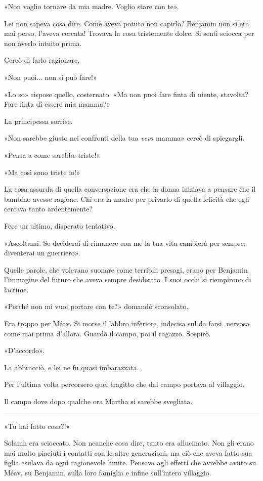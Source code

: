 \documentclass[a4paper,11pt,oneside,openright,final]{memoir}
\begin{document}
«Non voglio tornare da mia madre. Voglio stare con te».

Lei non sapeva cosa dire. Come aveva potuto non capirlo? Benjamin non si era mai
perso, l'aveva cercata! Trovava la cosa tristemente dolce. Si sentì sciocca per
non averlo intuito prima.

Cercò di farlo ragionare.

«Non puoi... non si può fare!»

«Lo so» rispose quello, costernato. «Ma non puoi fare finta di niente,
stavolta? Fare finta di essere mia mamma?»

La principessa sorrise.

«Non sarebbe giusto nei confronti della tua \emph{vera} mamma» cercò di
spiegargli.

«Pensa a come sarebbe triste!»

«Ma così sono triste io!»

La cosa assurda di quella conversazione era che la donna iniziava a pensare che
il bambino avesse ragione. Chi era la madre per privarlo di quella felicità che
egli cercava tanto ardentemente?

Fece un ultimo, disperato tentativo.

«Ascoltami. Se deciderai di rimanere con me la tua vita cambierà per sempre:
diventerai un guerriero».

Quelle parole, che volevano suonare come terribili presagi, erano per Benjamin
l'immagine del futuro che aveva sempre desiderato. I suoi occhi si riempirono di
lacrime.

«Perché non mi vuoi portare con te?» domandò sconsolato.

Era troppo per Méav. Si morse il labbro inferiore, indecisa sul da farsi,
nervosa come mai prima d'allora. Guardò il campo, poi il ragazzo. Sospirò.

«D'accordo».

La abbracciò, e lei ne fu quasi imbarazzata.

Per l'ultima volta percorsero quel tragitto che dal campo portava al villaggio.

Il campo dove dopo qualche ora Martha si sarebbe svegliata.

\plainbreak{1}

«Tu hai fatto cosa?!»

Solamh era scioccato. Non neanche cosa dire, tanto era allucinato. Non gli erano
mai molto piaciuti i contatti con le altre generazioni, ma ciò che aveva fatto
sua figlia esulava da ogni ragionevole limite. Pensava agli effetti che avrebbe
avuto su Méav, su Benjamin, sulla loro famiglia e infine sull'intero villaggio.
\end{document}
